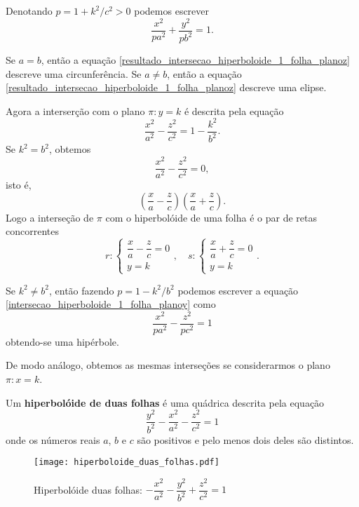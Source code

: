 Denotando $p = 1 + k^2/c^2 > 0$ podemos escrever
\begin{equation}\label{resultado_intersecao_hiperboloide_1_folha_planoz}
	\dfrac{x^2}{pa^2} + \dfrac{y^2}{pb^2} = 1.
\end{equation}

Se $a = b$, ent\~ao a equa\c{c}\~ao \eqref{resultado_intersecao_hiperboloide_1_folha_planoz} descreve uma circunfer\^encia. Se $a \ne b$, ent\~ao a equa\c{c}\~ao \eqref{resultado_intersecao_hiperboloide_1_folha_planoz} descreve uma elipse.

Agora a interser\c{c}\~ao com o plano $\pi : y = k$ \'e descrita pela equa\c{c}\~ao
\begin{equation}\label{intersecao_hiperboloide_1_folha_planoy}
	\dfrac{x^2}{a^2} - \dfrac{z^2}{c^2} = 1 - \dfrac{k^2}{b^2}.
\end{equation}
Se $k^2 = b^2$, obtemos
\[
	\dfrac{x^2}{a^2} - \dfrac{z^2}{c^2} = 0,	
\]
isto \'e,
\[
	\left(\dfrac{x}{a} - \dfrac{z}{c}\right)\left(\dfrac{x}{a} + \dfrac{z}{c}\right).
\]
Logo a interse\c{c}\~ao de $\pi$ com o hiperbol\'oide de uma folha \'e o par de retas concorrentes
\[
	r : \begin{cases}
		\dfrac{x}{a} - \dfrac{z}{c} = 0\\
		y = k
	\end{cases}, \quad s : \begin{cases}
		\dfrac{x}{a} + \dfrac{z}{c} = 0\\
		y = k
	\end{cases}.
\]

Se $k^2 \ne b^2$, ent\~ao fazendo $p = 1 - k^2/b^2$ podemos escrever a equa\c{c}\~ao \eqref{intersecao_hiperboloide_1_folha_planoy} como
\[
	\dfrac{x^2}{pa^2} - \dfrac{z^2}{pc^2} = 1	
\]
obtendo-se uma hip\'erbole.

De modo an\'alogo, obtemos as mesmas interse\c{c}\~oes se considerarmos o plano $\pi : x = k$.

\begin{definicao}
	Um \textbf{hiperbol\'oide de duas folhas} \'e uma qu\'adrica descrita pela equa\c{c}\~ao
	\[
		\dfrac{y^2}{b^2} - \dfrac{x^2}{a^2} - \dfrac{z^2}{c^2} = 1
	\]
	onde os n\'umeros reais $a$, $b$ e $c$ s\~ao positivos e pelo menos dois deles s\~ao distintos.
\end{definicao}

\begin{figure}[!h]
	\centering
	\caption{Hiperbol\'oide duas folhas: $-\dfrac{x^2}{a^2} - \dfrac{y^2}{b^2} + \dfrac{z^2}{c^2} = 1$}
	\texttt{[image: hiperboloide\_duas\_folhas.pdf]}
\end{figure}

